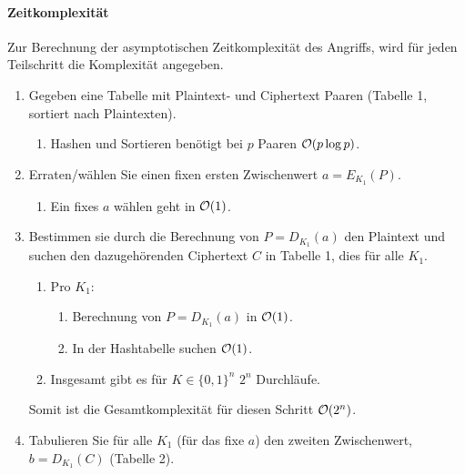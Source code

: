 \paragraph{Zeitkomplexität}
Zur Berechnung der asymptotischen Zeitkomplexität des Angriffs, wird für jeden 
Teilschritt die Komplexität angegeben.
\begin{enumerate}
    \item Gegeben eine Tabelle mit Plaintext- und Ciphertext Paaren
          (Tabelle 1, sortiert nach Plaintexten).
          \begin{enumerate}
            \item Hashen und Sortieren benötigt bei $p$ Paaren $\mathcal{O} (p\log p)$.
          \end{enumerate}
    \item Erraten/wählen Sie einen fixen ersten Zwischenwert $a = E_{K_1}(P)$.
          \begin{enumerate}
            \item Ein fixes $a$ wählen geht in $\mathcal{O} (1)$.
          \end{enumerate}
    \item Bestimmen sie durch die Berechnung von $P = D_{K_1} (a)$ den
          Plaintext und suchen den dazugehörenden Ciphertext $C$ in Tabelle
          1, dies für alle $K_1$.
          \begin{enumerate}
            \item Pro $K_1$:
            \begin{enumerate}
                \item Berechnung von $P = D_{K_1} (a)$ in $\mathcal{O} (1)$.
                \item In der Hashtabelle suchen $\mathcal{O} (1)$.
            \end{enumerate}
            \item Insgesamt gibt es für $K \in \{0, 1\}^n$ $2^n$ Durchläufe. 
          \end{enumerate}
          Somit ist die Gesamtkomplexität für diesen Schritt $\mathcal{O}(2^n)$.
    \item Tabulieren Sie für alle $K_1$ (für das fixe $a$) den zweiten
          Zwischenwert, $b = D_{K_1} (C)$ (Tabelle 2).\vspace*{1em}\\

\end{enumerate}
